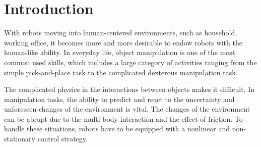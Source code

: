 \section{Introduction}
\label{intro}
With robots moving into human-centered environments, such as household, working office, it becomes more and more desirable to endow robots with the human-like ability. In everyday life, object manipulation is one of the most common used skills, which includes a large category of activities ranging from the simple pick-and-place task to the complicated dexterous manipulation task.


The complicated physics in the interactions between objects makes it difficult.
In manipulation tasks, the ability to predict and react to the uncertainty and unforeseen changes of the environment is vital. The changes of the environment can be abrupt due to the multi-body interaction and the effect of friction. To handle these situations, robots have to be equipped with a nonlinear and non-stationary control strategy.





